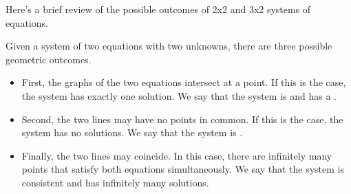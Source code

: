 \documentclass{ximera}
\begin{document}
    \begin{exploration}
    
      Here's a brief review of the possible outcomes of 2x2 and 3x2 systems of equations.
       
      Given a system of two equations with two unknowns, there are three possible geometric outcomes. 
      
      \begin{itemize}
          \item First, the graphs of the two equations intersect at a point.  If this is the case, the system has exactly one solution. We say that the system is  and has a . 
           
          \begin{center}
            \end{center}
          \item Second, the two lines may have no points in common.  If this is the case, the system has no solutions.  We say that the system is . 
          \begin{center}
            \end{center}
          \item Finally, the two lines may coincide.  In this case, there are infinitely many points that satisfy both equations simultaneously.  We say that the system is consistent and has infinitely many solutions.
          \begin{center}
          \begin{tikzpicture}[scale=.5]
           

\end{tikzpicture}
\end{center}
\end{itemize}
\end{exploration}
\end{document}
